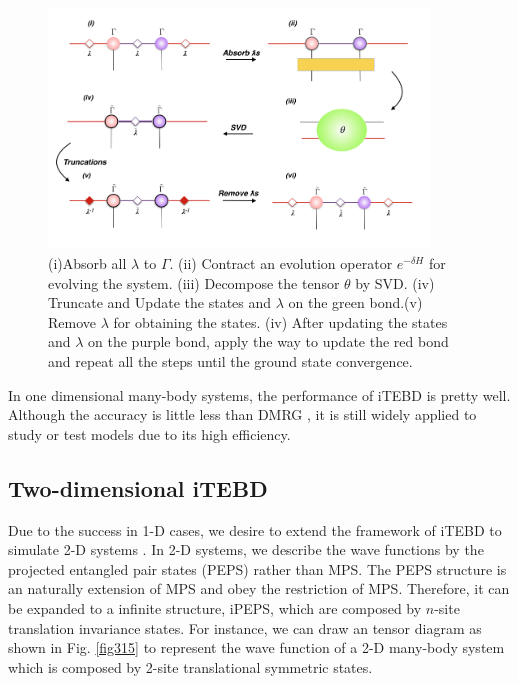 \begin{figure}[ht][b]
	\centering
	\includegraphics[width=0.90\textwidth]{figures/fig313.png}
	\caption[The tensor network diagrams for the 1-D iTEBD]{ (i)Absorb all $\lambda$ to $\Gamma$. (ii) Contract an evolution operator $e^{-\delta H}$ for evolving the system. (iii) Decompose the tensor $\theta$ by SVD. (iv) Truncate and Update the states and $\lambda$ on the green bond.(v) Remove $
		\lambda$ for obtaining the states. (iv) After updating the states and $\lambda$ on the purple bond, apply the way to update the red bond and repeat all the steps until the ground state convergence.}
	\label{fig314}
\end{figure}

In one dimensional many-body systems, the performance of iTEBD is pretty well. Although the accuracy is little less than DMRG \cite{}, it is still widely applied to study or test models due to its high efficiency.

\subsection{Two-dimensional iTEBD}
\label{2ditebd}

Due to the success in 1-D cases, we desire to extend the framework of iTEBD to simulate 2-D systems . In 2-D systems, we describe the wave functions by the projected entangled pair states (PEPS) rather than MPS. The PEPS structure is an naturally extension of MPS and obey the restriction of MPS. Therefore, it can be expanded to a infinite structure, iPEPS, which are composed by $n$-site translation invariance states. For instance, we can draw an tensor diagram as shown in Fig. \ref{fig315} to represent the wave function of a 2-D many-body system which is composed by 2-site translational symmetric states.

